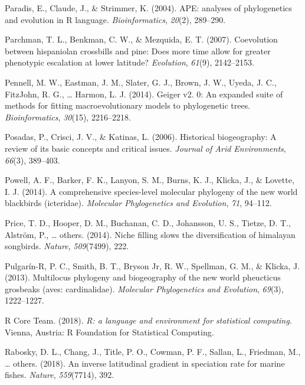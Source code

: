 \documentclass[
  english,
  man]{apa6}
\newlength{\cslhangindent}
\newlength{\cslentryspacingunit} %
\newenvironment{CSLReferences}[2] %
 {%
  \setlength{\parindent}{0pt}
  \ifodd #1
  \let\oldpar\par
  \def\par{\hangindent=\cslhangindent\oldpar}
  \fi
  \setlength{\parskip}{#2\cslentryspacingunit}
 }%
 {}
\begin{document}
\begin{CSLReferences}{1}{0}
\leavevmode{}%
Paradis, E., Claude, J., \& Strimmer, K. (2004). {APE: analyses of phylogenetics and evolution in R language}. \emph{Bioinformatics}, \emph{20}(2), 289--290.

\leavevmode{}%
Parchman, T. L., Benkman, C. W., \& Mezquida, E. T. (2007). Coevolution between hispaniolan crossbills and pine: Does more time allow for greater phenotypic escalation at lower latitude? \emph{Evolution}, \emph{61}(9), 2142--2153.

\leavevmode{}%
Pennell, M. W., Eastman, J. M., Slater, G. J., Brown, J. W., Uyeda, J. C., FitzJohn, R. G., \ldots{} Harmon, L. J. (2014). Geiger v2. 0: An expanded suite of methods for fitting macroevolutionary models to phylogenetic trees. \emph{Bioinformatics}, \emph{30}(15), 2216--2218.

\leavevmode{}%
Posadas, P., Crisci, J. V., \& Katinas, L. (2006). Historical biogeography: A review of its basic concepts and critical issues. \emph{{Journal of Arid Environments}}, \emph{66}(3), 389--403.

\leavevmode{}%
Powell, A. F., Barker, F. K., Lanyon, S. M., Burns, K. J., Klicka, J., \& Lovette, I. J. (2014). A comprehensive species-level molecular phylogeny of the new world blackbirds (icteridae). \emph{Molecular Phylogenetics and Evolution}, \emph{71}, 94--112.

\leavevmode{}%
Price, T. D., Hooper, D. M., Buchanan, C. D., Johansson, U. S., Tietze, D. T., Alström, P., \ldots{} others. (2014). Niche filling slows the diversification of himalayan songbirds. \emph{Nature}, \emph{509}(7499), 222.

\leavevmode{}%
Pulgarín-R, P. C., Smith, B. T., Bryson Jr, R. W., Spellman, G. M., \& Klicka, J. (2013). Multilocus phylogeny and biogeography of the new world pheucticus grosbeaks (aves: cardinalidae). \emph{Molecular Phylogenetics and Evolution}, \emph{69}(3), 1222--1227.

\leavevmode{}%
R Core Team. (2018). \emph{{R: a language and environment for statistical computing}}. Vienna, Austria: R Foundation for Statistical Computing.

\leavevmode{}%
Rabosky, D. L., Chang, J., Title, P. O., Cowman, P. F., Sallan, L., Friedman, M., \ldots{} others. (2018). An inverse latitudinal gradient in speciation rate for marine fishes. \emph{Nature}, \emph{559}(7714), 392.


\end{CSLReferences}
\end{document}
